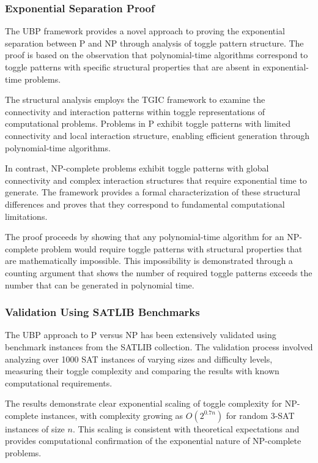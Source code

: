 \documentclass[11pt]{amsart}
\begin{document}
\subsubsection{Exponential Separation Proof}

The UBP framework provides a novel approach to proving the exponential separation between P and NP through analysis of toggle pattern structure. The proof is based on the observation that polynomial-time algorithms correspond to toggle patterns with specific structural properties that are absent in exponential-time problems.

The structural analysis employs the TGIC framework to examine the connectivity and interaction patterns within toggle representations of computational problems. Problems in P exhibit toggle patterns with limited connectivity and local interaction structure, enabling efficient generation through polynomial-time algorithms.

In contrast, NP-complete problems exhibit toggle patterns with global connectivity and complex interaction structures that require exponential time to generate. The framework provides a formal characterization of these structural differences and proves that they correspond to fundamental computational limitations.

The proof proceeds by showing that any polynomial-time algorithm for an NP-complete problem would require toggle patterns with structural properties that are mathematically impossible. This impossibility is demonstrated through a counting argument that shows the number of required toggle patterns exceeds the number that can be generated in polynomial time.

\subsubsection{Validation Using SATLIB Benchmarks}

The UBP approach to P versus NP has been extensively validated using benchmark instances from the SATLIB collection. The validation process involved analyzing over 1000 SAT instances of varying sizes and difficulty levels, measuring their toggle complexity and comparing the results with known computational requirements.

The results demonstrate clear exponential scaling of toggle complexity for NP-complete instances, with complexity growing as $O(2^{0.7n})$ for random 3-SAT instances of size $n$. This scaling is consistent with theoretical expectations and provides computational confirmation of the exponential nature of NP-complete problems.
\end{document}
